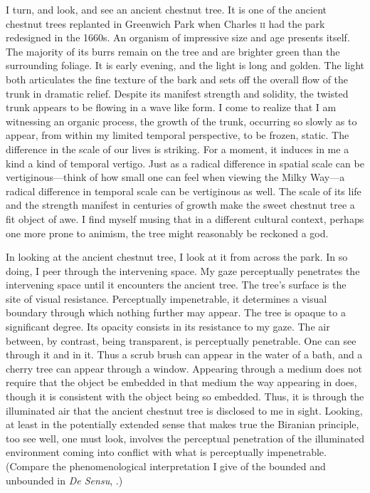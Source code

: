 I turn, and look, and see an ancient chestnut tree. It is one of the ancient chestnut trees replanted in Greenwich Park when Charles \textsc{ii} had the park redesigned in the 1660s. An organism of impressive size and age presents itself. The majority of its burrs remain on the tree and are brighter green than the surrounding foliage. It is early evening, and the light is long and golden. The light both articulates the fine texture of the bark and sets off the overall flow of the trunk in dramatic relief. Despite its manifest strength and solidity, the twisted trunk appears to be flowing in a wave like form. I come to realize that I am witnessing an organic process, the growth of the trunk, occurring so slowly as to appear, from within my limited temporal perspective, to be frozen, static. The difference in the scale of our lives is striking. For a moment, it induces in me a kind a kind of temporal vertigo.  Just as a radical difference in spatial scale can be vertiginous---think of how small one can feel when viewing the Milky Way---a radical difference in temporal scale can be vertiginous as well. The scale of its life and the strength manifest in centuries of growth make the sweet chestnut tree a fit object of awe. I find myself musing that in a different cultural context, perhaps one more prone to animism, the tree might reasonably be reckoned a god. 

In looking at the ancient chestnut tree, I look at it from across the park. In so doing, I peer through the intervening space. My gaze perceptually penetrates the intervening space until it encounters the ancient tree. The tree's surface is the site of visual resistance. Perceptually impenetrable, it determines a visual boundary through which nothing further may appear. The tree is opaque to a significant degree. Its opacity consists in its resistance to my gaze. The air between, by contrast, being transparent, is perceptually penetrable. One can see through it and in it. Thus a scrub brush can appear in the water of a bath, and a cherry tree can appear through a window. Appearing through a medium does not require that the object be embedded in that medium the way appearing in does, though it is consistent with the object being so embedded. Thus, it is through the illuminated air that the ancient chestnut tree is disclosed to me in sight. Looking, at least in the potentially extended sense that makes true the Biranian principle, too see well, one must look, involves the perceptual penetration of the illuminated environment coming into conflict with what is perceptually impenetrable. (Compare the phenomenological interpretation I give of the bounded and unbounded in \emph{De Sensu}, \citealt[chapter 3.3]{Kalderon:2015fr}.)

